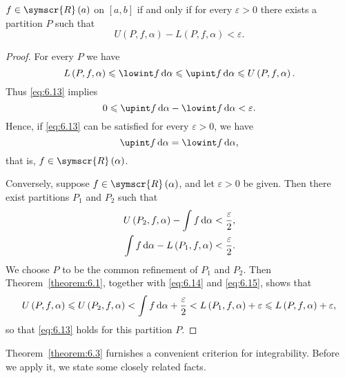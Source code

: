 \begin{theorem}\label{theorem:6.3}
    \(f\in\symscr{R}\left(a\right)\) on \(\left[a,b\right]\) if and only if for every \(\varepsilon>0\) there exists a partition \(P\) such that
    \begin{equation}
        U\left(P,f,\alpha\right)-L\left(P,f,\alpha\right)<\varepsilon.\label{eq:6.13}
    \end{equation}
\end{theorem}

\begin{proof}
    For every \(P\) we have
    \begin{equation*}
        L\left(P,f,\alpha\right)\leqslant\lowint f\odif{\alpha}\leqslant\upint f\odif{\alpha}\leqslant U\left(P,f,\alpha\right).
    \end{equation*}
    Thus \eqref{eq:6.13} implies
    \begin{equation*}
        0\leqslant\upint f\odif{\alpha}-\lowint f\odif{\alpha}<\varepsilon.
    \end{equation*}
    Hence, if \eqref{eq:6.13} can be satisfied for every \(\varepsilon>0\), we have
    \begin{equation*}
        \upint f\odif{\alpha}=\lowint f\odif{\alpha},
    \end{equation*}
    that is, \(f\in\symscr{R}\left(\alpha\right)\).

    Conversely, suppose \(f\in\symscr{R}\left(\alpha\right)\), and let \(\varepsilon>0\) be given. Then there exist partitions \(P_1\) and \(P_2\) such that
    \begin{align}
        U\left(P_2,f,\alpha\right)-\int f\odif{\alpha}&<\frac{\varepsilon}{2},\label{eq:6.14}\\
        \int f\odif{\alpha}-L\left(P_1,f,\alpha\right)&<\frac{\varepsilon}{2}.\label{eq:6.15}
    \end{align}
    We choose \(P\) to be the common refinement of \(P_1\) and \(P_2\). Then Theorem~\ref{theorem:6.1}, together with \eqref{eq:6.14} and \eqref{eq:6.15}, shows that
    \begin{equation*}
        U\left(P,f,\alpha\right)\leqslant U\left(P_2,f,\alpha\right)<\int f\odif{\alpha}+\frac{\varepsilon}{2}<L\left(P_1,f,\alpha\right)+\varepsilon\leqslant L\left(P,f,\alpha\right)+\varepsilon,
    \end{equation*}
    so that \eqref{eq:6.13} holds for this partition \(P\).
\end{proof}

Theorem~\ref{theorem:6.3} furnishes a convenient criterion for integrability. Before we apply it, we state some closely related facts.

